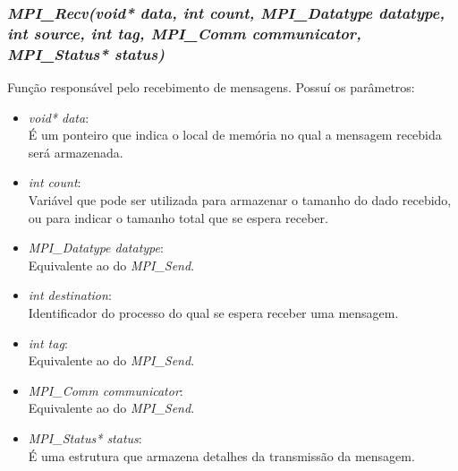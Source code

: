 		\subsubsection{\normalsize \textit{MPI\_Recv(void* data, int count, MPI\_Datatype datatype, int source, int tag, MPI\_Comm communicator, MPI\_Status* status)}}\label{recv}
			Função responsável pelo recebimento de mensagens. Possuí os parâmetros:
			\begin{itemize}
				\item \textit{void* data}:\\
					É um ponteiro que indica o local de memória no qual a mensagem recebida será armazenada.
				
				\item \textit{int count}:\\
					Variável que pode ser utilizada para armazenar o tamanho do dado recebido, ou para indicar o tamanho total que se espera receber.
					
				\item \textit{MPI\_Datatype datatype}:\\
					Equivalente ao do \textit{MPI\_Send}.
					
				\item \textit{int destination}:\\
					Identificador do processo do qual se espera receber uma mensagem.
										
				\item \textit{int tag}:\\
					Equivalente ao do \textit{MPI\_Send}.
					
				\item \textit{MPI\_Comm communicator}:\\
					Equivalente ao do \textit{MPI\_Send}.
				
				\item \textit{MPI\_Status* status}:\\
					É uma estrutura que armazena detalhes da transmissão da mensagem.
			\end{itemize}
			